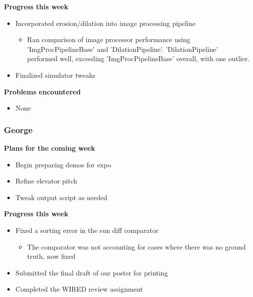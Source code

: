 \documentclass[10pt, onecolumn, draftclsnofoot, letterpaper, compsoc]{IEEEtran}
\begin{document}
    \noindent \textbf{Progress this week}

    \begin{itemize}

    \item Incorporated erosion/dilation into image processing pipeline
    \begin{itemize}
      \item Ran comparison of image processor performance using 'ImgProcPipelineBase'
        and 'DilationPipeline'. 'DilationPipeline' performed well, exceeding
        'ImgProcPipelineBase' overall, with one outlier.
    \end{itemize}

    \item Finalized simulator tweaks

    \end{itemize}

    \noindent \textbf{Problems encountered}

    \begin{itemize}

    \item None

    \end{itemize}

    \subsubsection{George}

    \noindent \textbf{Plans for the coming week}

    \begin{itemize}

    \item Begin preparing demos for expo
    \item Refine elevator pitch
    \item Tweak output script as needed

    \end{itemize}

    \noindent \textbf{Progress this week}

    \begin{itemize}

    \item Fixed a sorting error in the sun diff comparator
    \begin{itemize}
      \item The comparator was not accounting for cases where there was no ground truth, now fixed
    \end{itemize}

    \item Submitted the final draft of our poster for printing
    \item Completed the WIRED review assignment

    \end{itemize}
\end{document}
